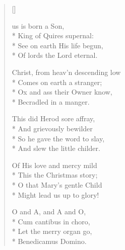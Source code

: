 \newHymn
{}

\begin{verse}[\versewidth]

 us is born a Son,\\*
King of Quires supernal:\\*
See on earth His life begun,\\*
Of lords the Lord eternal.

 Christ, from heav'n descending low\\*
Comes on earth a stranger;\\*
Ox and ass their Owner know,\\*
Becradled in a manger.

 This did Herod sore affray,\\*
And grievously bewilder\\*
So he gave the word to slay,\\*
And slew the little childer.

 Of His love and mercy mild\\*
This the Christmas story;\\*
O that Mary's gentle Child\\*
Might lead us up to glory!

 O and A, and A and O,\\*
Cum cantibus in choro,\\*
Let the merry organ go,\\*
Benedicamus Domino.

\end{verse}

